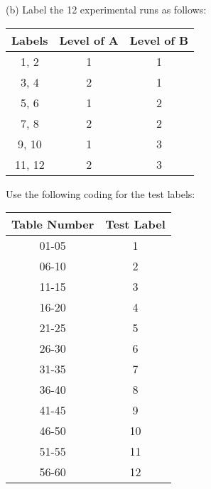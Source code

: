 \documentclass[11pt]{article}\usepackage[]{graphicx}\usepackage[]{color}
\begin{document}
\begin{itemize}
(b) Label the 12 experimental runs as follows:
\begin{center}
	\begin{tabular}{|c|c|c|}
		\hline
		Labels & Level of A &  Level of B\\
		\hline
		1, 2 & 1 & 1\\
		3, 4 & 2 & 1\\
		5, 6 & 1 & 2\\
		7, 8 & 2 & 2\\
		9, 10 & 1 & 3\\
		11, 12 & 2 &3\\
		\hline
	\end{tabular}
	
\end{center}
Use the following coding for the test labels:
\begin{center}
	\begin{tabular}{|c|c|}
		\hline
		Table Number & Test Label\\
		\hline
		01-05 & 1\\
		06-10 & 2\\
		11-15 & 3\\
		16-20 & 4\\
		21-25 & 5\\
		26-30 & 6\\
		31-35 & 7\\
		36-40 & 8\\
		41-45 & 9\\
		46-50 & 10\\
		51-55 & 11\\
		56-60 & 12\\
		\hline
	

\end{tabular}
\end{center}
\end{itemize}
\end{document}
